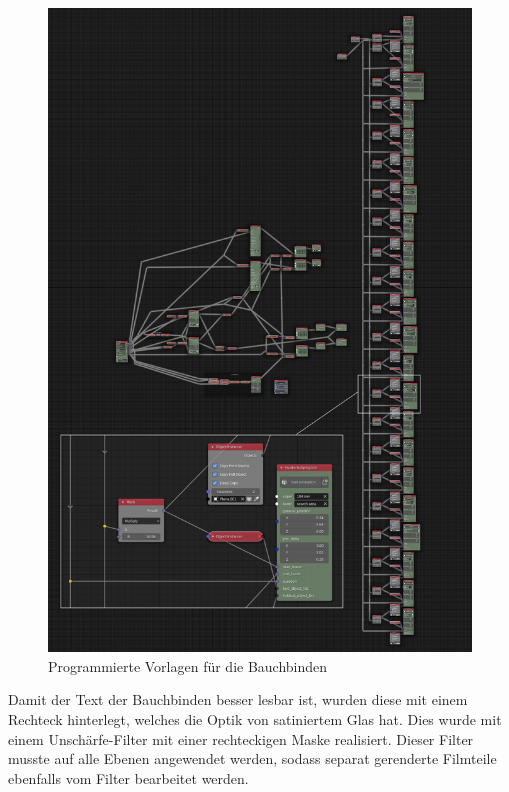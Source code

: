 \begin{figure}[H]
\begin{center}
\includegraphics[width=\textwidth]{gfx/post/call-out.jpg}
\caption{Programmierte Vorlagen für die Bauchbinden}
\label{out}
\end{center}
\end{figure}
\noindent
Damit der Text der Bauchbinden besser lesbar ist, wurden diese mit einem Rechteck hinterlegt, welches die Optik von satiniertem Glas hat. Dies wurde mit einem Unschärfe-Filter mit einer rechteckigen Maske realisiert. Dieser Filter musste auf alle Ebenen angewendet werden, sodass separat gerenderte Filmteile ebenfalls vom Filter bearbeitet werden.

